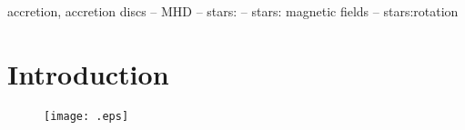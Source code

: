 \documentclass[useAMS,usenatbib]{mn2e}
\title{}
\author[Caroline R.\ D'Angelo]
       {C.\ R.\ D'Angelo}
\date{\today}
\begin{document}
\maketitle
\label{firstpage}
\begin{abstract}
\end{abstract}
\begin{keywords}
accretion, accretion discs -- MHD -- stars:
-- stars: magnetic fields --
stars:rotation
\end{keywords}

\section{Introduction}

\begin{figure}
 {\texttt{[image: .eps]}}
  \caption{\label{fig:} }
\end{figure}



\label{lastpage}
\end{document}
